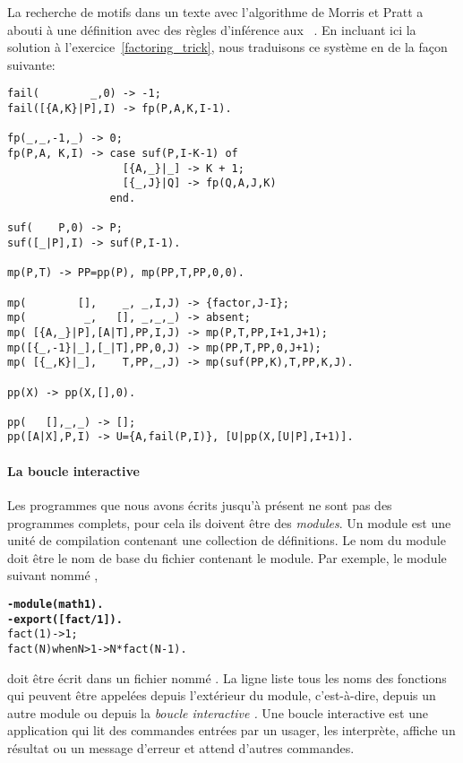 La recherche de motifs dans un texte avec l'algorithme de Morris et
Pratt a
abouti à une définition avec des règles d'inférence aux
\figs~. En incluant ici la solution à
l'exercice~\vref{factoring_trick}, nous traduisons ce système en
\Erlang de la façon suivante:
\begin{verbatim}
fail(        _,0) -> -1;
fail([{A,K}|P],I) -> fp(P,A,K,I-1).

fp(_,_,-1,_) -> 0;
fp(P,A, K,I) -> case suf(P,I-K-1) of
                  [{A,_}|_] -> K + 1;
                  [{_,J}|Q] -> fp(Q,A,J,K)
                end.

suf(    P,0) -> P;
suf([_|P],I) -> suf(P,I-1).

mp(P,T) -> PP=pp(P), mp(PP,T,PP,0,0).

mp(        [],    _, _,I,J) -> {factor,J-I};
mp(         _,   [], _,_,_) -> absent;
mp( [{A,_}|P],[A|T],PP,I,J) -> mp(P,T,PP,I+1,J+1);
mp([{_,-1}|_],[_|T],PP,0,J) -> mp(PP,T,PP,0,J+1);
mp( [{_,K}|_],    T,PP,_,J) -> mp(suf(PP,K),T,PP,K,J).

pp(X) -> pp(X,[],0).

pp(   [],_,_) -> [];
pp([A|X],P,I) -> U={A,fail(P,I)}, [U|pp(X,[U|P],I+1)].
\end{verbatim}


\paragraph{La boucle interactive \Erlang}

Les programmes que nous avons écrits jusqu'à présent ne sont pas des
programmes \Erlang complets, pour cela ils doivent être des
\emph{modules}. Un module est une unité de compilation contenant une
collection de définitions. Le nom du module doit être le nom de base
du fichier contenant le module. Par exemple, le module suivant nommé
,
\begin{alltt}
\textbf{-module(math1).}\hfill% \emph{Sans l'extension} .erl
\textbf{-export([fact/1]).}
fact(1)            -> 1;
fact(N) when N > 1 -> N * fact(N-1).
\end{alltt}
doit être écrit dans un fichier nommé . La ligne
 liste tous les noms des fonctions qui peuvent être
appelées depuis l'extérieur du module, c'est-à-dire, depuis un autre
module ou depuis la \emph{boucle interactive \Erlang.} Une boucle
interactive est une application qui lit des commandes entrées par un
usager, les interprète, affiche un résultat ou un message d'erreur et
attend d'autres commandes.

